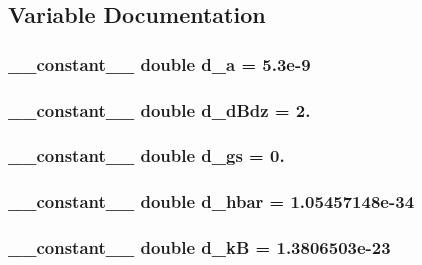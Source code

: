 \subsection{Variable Documentation}
\hypertarget{set_up_8cu_a9de002c64acd76b9a5a11c0e3519838c}{
\subsubsection[{d\+\_\+a}]{\setlength{\rightskip}{0pt plus 5cm}\+\_\+\+\_\+constant\+\_\+\+\_\+ double d\+\_\+a = 5.\+3e-\/9}}\label{set_up_8cu_a9de002c64acd76b9a5a11c0e3519838c}
\hypertarget{set_up_8cu_afa16fa4a33416df0d9677c9cbf1c6619}{
\subsubsection[{d\+\_\+d\+Bdz}]{\setlength{\rightskip}{0pt plus 5cm}\+\_\+\+\_\+constant\+\_\+\+\_\+ double d\+\_\+d\+Bdz = 2.}}\label{set_up_8cu_afa16fa4a33416df0d9677c9cbf1c6619}
\hypertarget{set_up_8cu_ad7fc9ddbbf69cdea9bade997bd3f58f4}{
\subsubsection[{d\+\_\+gs}]{\setlength{\rightskip}{0pt plus 5cm}\+\_\+\+\_\+constant\+\_\+\+\_\+ double d\+\_\+gs = 0.}}\label{set_up_8cu_ad7fc9ddbbf69cdea9bade997bd3f58f4}
\hypertarget{set_up_8cu_a42ed36be77a88944d259857a94f80eb4}{
\subsubsection[{d\+\_\+hbar}]{\setlength{\rightskip}{0pt plus 5cm}\+\_\+\+\_\+constant\+\_\+\+\_\+ double d\+\_\+hbar = 1.\+05457148e-\/34}}\label{set_up_8cu_a42ed36be77a88944d259857a94f80eb4}
\hypertarget{set_up_8cu_a02c2b3a2e3a9d15ae261492f19abb6e0}{
\subsubsection[{d\+\_\+k\+B}]{\setlength{\rightskip}{0pt plus 5cm}\+\_\+\+\_\+constant\+\_\+\+\_\+ double d\+\_\+k\+B = 1.\+3806503e-\/23}}\label{set_up_8cu_a02c2b3a2e3a9d15ae261492f19abb6e0}
